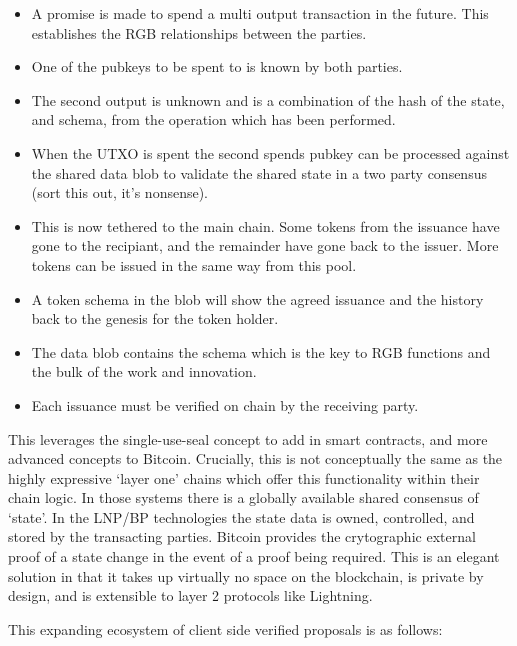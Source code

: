 \begin{itemize}
\item A promise is made to spend a multi output transaction in the future. This establishes the RGB relationships between the parties.
\item One of the pubkeys to be spent to is known by both parties.
\item The second output is unknown and is a combination of the hash of the state, and schema, from the operation which has been performed.
\item When the UTXO is spent the second spends pubkey can be processed against the shared data blob to validate the shared state in a two party consensus  (sort this out, it's nonsense).
\item This is now tethered to the main chain. Some tokens from the issuance have gone to the recipiant, and the remainder have gone back to the issuer. More tokens can be issued in the same way from this pool. 
\item A token schema in the blob will show the agreed issuance and the history back to the genesis for the token holder. 
\item The data blob contains the schema which is the key to RGB functions and the bulk of the work and innovation. 
\item Each issuance must be verified on chain by the receiving party. 
\end{itemize} 
This leverages the single-use-seal concept to add in smart contracts, and more advanced concepts to Bitcoin. Crucially, this is not conceptually the same as the highly expressive `layer one' chains which offer this functionality within their chain logic. In those systems there is a globally available shared consensus of `state'. In the LNP/BP technologies the state data is owned, controlled, and stored by the transacting parties. Bitcoin provides the crytographic external proof of a state change in the event of a proof being required. This is an elegant solution in that it takes up virtually no space on the blockchain, is private by design, and is extensible to layer 2 protocols like Lightning.\par
This expanding ecosystem of client side verified proposals is as follows:
